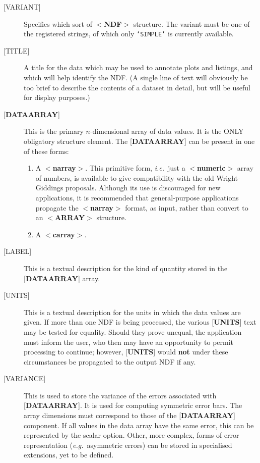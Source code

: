 \documentclass[twoside,11pt]{article}
\renewcommand{\_}{\texttt{\symbol{95}}}
\begin{document}
\begin{description}
\item [{[}VARIANT{]}]  Specifies which
sort of $<${\bf NDF}$>$ structure.  The variant
must be one
of the registered strings, of which only {\tt `SIMPLE'} is currently 
available.
\item [{[}TITLE{]}]  A title for the data which
may be used to annotate plots and
listings, and which will help identify the NDF.
(A single line of text will obviously be too
brief to describe the contents
of a dataset in detail, but will
be useful for display purposes.)
\item [{[}{\bf DATA\_ARRAY}{]}]  This is the primary
$n$-dimensional array of data values.
It is the ONLY obligatory structure element.  The
{[}{\bf DATA\_ARRAY}{]} can be 
present in one of these forms:
\begin{enumerate}
\item A $<${\bf narray}$>$.
This primitive form, {\it i.e.}\ just a $<${\bf numeric}$>$ array of numbers,
is available to give compatibility with the old Wright-Giddings proposals.
Although its
use is discouraged for new applications, it
is recommended that general-purpose applications
propagate the $<${\bf narray}$>$ format, as input,
rather than convert to an
\mbox{$<${\bf ARRAY}$>$} structure.
\item A $<${\bf c\_array}$>$.
\end{enumerate}
\item [{[}LABEL{]}]  This is a textual description for the kind of quantity
stored in the {[}{\bf DATA\_ARRAY}{]} array.
\item [{[}UNITS{]}]  This is a textual description for the units in which the
data values are given. If more than one NDF is being processed, the various
{[}{\bf UNITS}{]} text may be tested for equality.  Should they prove
unequal, the
application must inform the user, who then may have an opportunity to 
permit processing to continue;  however, {[}{\bf UNITS}{]}
would {\bf not} under these circumstances be
propagated to the output NDF if any.
\item [{[}VARIANCE{]}]  This is used to store the variance of the
errors associated with {[}{\bf DATA\_ARRAY}{]}.
It is used for computing symmetric error bars.
The array dimensions must correspond to those of the
{[}{\bf DATA\_ARRAY}{]} component.
If all values in the data array have the same error, this can
be represented by the scalar option. 
Other, more complex, forms of error representation
({\it e.g.}\  asymmetric errors)
can be stored in specialised extensions, yet to be defined.

\end{description}
\end{document}
